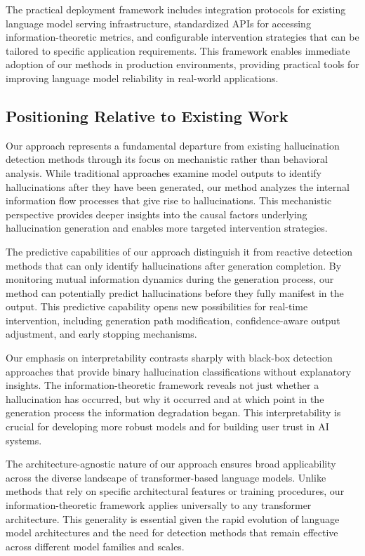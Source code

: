 The practical deployment framework includes integration protocols for existing language model serving infrastructure, standardized APIs for accessing information-theoretic metrics, and configurable intervention strategies that can be tailored to specific application requirements. This framework enables immediate adoption of our methods in production environments, providing practical tools for improving language model reliability in real-world applications.

\subsection{Positioning Relative to Existing Work}

Our approach represents a fundamental departure from existing hallucination detection methods through its focus on mechanistic rather than behavioral analysis. While traditional approaches examine model outputs to identify hallucinations after they have been generated, our method analyzes the internal information flow processes that give rise to hallucinations. This mechanistic perspective provides deeper insights into the causal factors underlying hallucination generation and enables more targeted intervention strategies.

The predictive capabilities of our approach distinguish it from reactive detection methods that can only identify hallucinations after generation completion. By monitoring mutual information dynamics during the generation process, our method can potentially predict hallucinations before they fully manifest in the output. This predictive capability opens new possibilities for real-time intervention, including generation path modification, confidence-aware output adjustment, and early stopping mechanisms.

Our emphasis on interpretability contrasts sharply with black-box detection approaches that provide binary hallucination classifications without explanatory insights. The information-theoretic framework reveals not just whether a hallucination has occurred, but why it occurred and at which point in the generation process the information degradation began. This interpretability is crucial for developing more robust models and for building user trust in AI systems.

The architecture-agnostic nature of our approach ensures broad applicability across the diverse landscape of transformer-based language models. Unlike methods that rely on specific architectural features or training procedures, our information-theoretic framework applies universally to any transformer architecture. This generality is essential given the rapid evolution of language model architectures and the need for detection methods that remain effective across different model families and scales.

